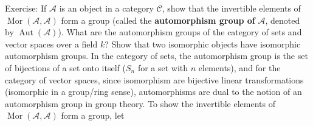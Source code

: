 Exercise: If $\mathcal{A} $ is an object in a category $\mathscr{C}$, show that the invertible elements of $\operatorname{Mor}(\mathcal{A} , \mathcal{A} )$ form a group (called the \textbf{automorphism group of } $\mathcal{A} $, denoted by $\operatorname{Aut}(\mathcal{A} )$). What are the automorphism groups of the category of sets and vector spaces over a field $k$? Show that two isomorphic objects have isomorphic automorphism groups. In the category of sets, the automorphism group is the set of bijections of a set onto itself ($S_n $ for a set with $n$ elements), and for the category of vector spaces, since isomorphism are bijective linear transformations (isomorphic in a group/ring sense), automorphisms are dual to the notion of an automorphism group in group theory. To show the invertible elements of $\operatorname{Mor}(\mathcal{A} ,\mathcal{A} )$ form a group, let


